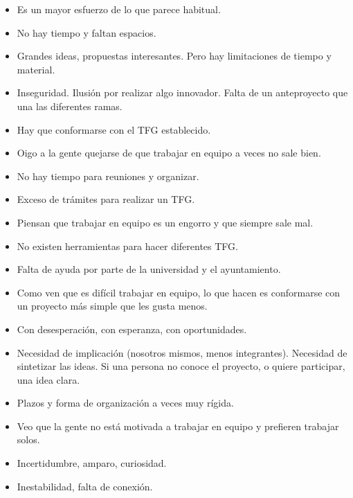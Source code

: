 \begin{itemize}
\begin{itemize}
        \item Es un mayor esfuerzo de lo que parece habitual.
        \item No hay tiempo y faltan espacios.
        \item Grandes ideas, propuestas interesantes. Pero hay limitaciones de tiempo y material.
        \item Inseguridad. Ilusión por realizar algo innovador. Falta de un anteproyecto que una las diferentes ramas.
        \item Hay que conformarse con el TFG establecido.
        \item Oigo a la gente quejarse de que trabajar en equipo a veces no sale bien.
        \item No hay tiempo para reuniones y organizar.
        \item Exceso de trámites para realizar un TFG.
        \item Piensan que trabajar en equipo es un engorro y que siempre sale mal.
        \item No existen herramientas para hacer diferentes TFG.
        \item Falta de ayuda por parte de la universidad y el ayuntamiento.
        \item Como ven que es difícil trabajar en equipo, lo que hacen es conformarse con un proyecto más simple que les gusta menos.
        \item Con desesperación, con esperanza, con oportunidades.
        \item Necesidad de implicación (nosotros mismos, menos integrantes). Necesidad de sintetizar las ideas. Si una persona no conoce el proyecto, o quiere participar, una idea clara.
        \item Plazos y forma de organización a veces muy rígida.
        \item Veo que la gente no está motivada a trabajar en equipo y prefieren trabajar solos.
        \item Incertidumbre, amparo, curiosidad.
        \item Inestabilidad, falta de conexión.
    \end{itemize}
\end{itemize}













